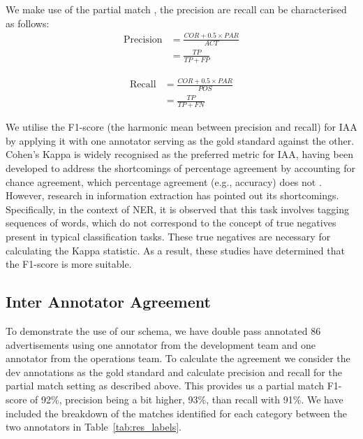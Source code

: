 \documentclass[11pt]{article}
\begin{document}
We make use of the partial match \citet{segura-bedmar-etal-2013-semeval}, the precision are recall can be characterised as follows:%
\begin{displaymath}
\begin{aligned}
\text{Precision} &= \frac{COR + 0.5 \times PAR}{ACT} \\
&= \frac{TP}{TP+FP}
\end{aligned}
\end{displaymath}

\begin{displaymath}
\begin{aligned}
\text{Recall} &= \frac{COR + 0.5 \times PAR}{POS} \\
&= \frac{TP}{TP+FN}
\end{aligned}
\end{displaymath}

\noindent
We utilise the F1-score (the harmonic mean between precision and recall) for IAA by applying it with one annotator serving as the gold standard against the other. Cohen's Kappa is widely recognised as the preferred metric for IAA, having been developed to address the shortcomings of percentage agreement by accounting for chance agreement, which percentage agreement (e.g., accuracy) does not \citep{McHugh2012}.  However, research in information extraction \citep{brandsen-etal-2020-creating, richie-etal-2022-inter} has pointed out its shortcomings. Specifically, in the context of NER, it is observed that this task involves tagging sequences of words, which do not correspond to the concept of true negatives present in typical classification tasks. These true negatives are necessary for calculating the Kappa statistic. As a result, these studies have determined that the F1-score is more suitable.


\subsection{Inter Annotator Agreement}


To demonstrate the use of our schema, we have double pass annotated 86 advertisements using one annotator from the development team and one annotator from the operations team. To calculate the agreement we consider the dev annotations as the gold standard and calculate precision and recall for the partial match setting as described above. This provides us a partial match F1-score of 92\%, precision being a bit higher, 93\%, than recall with 91\%. We have included the breakdown of the matches identified for each category between the two annotators in Table~\ref{tab:res_labels}. 
\end{document}
